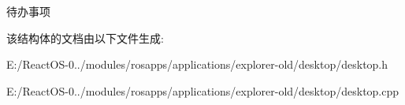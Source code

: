 \begin{DoxyRefDesc}{待办事项}
\item[\hyperlink{todo__todo000014}{待办事项}]\end{DoxyRefDesc}


该结构体的文档由以下文件生成\+:\begin{DoxyCompactItemize}
\item 
E\+:/\+React\+O\+S-\/0../modules/rosapps/applications/explorer-\/old/desktop/desktop.\+h\item 
E\+:/\+React\+O\+S-\/0../modules/rosapps/applications/explorer-\/old/desktop/desktop.\+cpp\end{DoxyCompactItemize}
